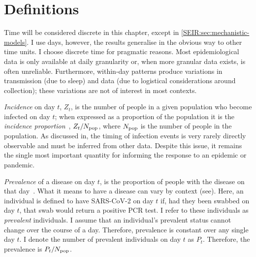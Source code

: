 \documentclass[thesis.tex]{subfiles}
\begin{document}
\section{Definitions} \label{inc-prev:sec:definitions}

Time will be considered discrete in this chapter, except in \cref{SEIR:sec:mechanistic-models}.
I use days, however, the results generalise in the obvious way to other time units.
I choose discrete time for pragmatic reasons.
Most epidemiological data is only available at daily granularity or, when more granular data exists, is often unreliable.
Furthermore, within-day patterns produce variations in transmission (\eg due to sleep) and data (\eg due to logistical considerations around collection); these variations are not of interest in most contexts.

\emph{Incidence} on day $t$, $Z_t$, is the number of people in a given population who become infected on day $t$; when expressed as a proportion of the population it is the \emph{incidence proportion}~\autocite[89]{lashModern}, $Z_t/N_\text{pop}$, where $N_\text{pop}$ is the number of people in the population.
As discussed in, the timing of infection events is very rarely directly observable and must be inferred from other data.
Despite this issue, it remains the single most important quantity for informing the response to an epidemic or pandemic.

\emph{Prevalence} of a disease on day $t$, is the proportion of people with the disease on that day~\autocite[90]{lashModern}.
What it means to have a disease can vary by context (see).
Here, an individual is defined to have SARS-CoV-2 on day $t$ if, had they been swabbed on day $t$, that swab would return a positive PCR test.
I refer to these individuals as \emph{prevalent} individuals.
I assume that an individual's prevalent status cannot change over the course of a day.
Therefore, prevalence is constant over any single day $t$.
I denote the number of prevalent individuals on day $t$ as $P_t$.
Therefore, the prevalence is $P_t/N_\text{pop}$.
\end{document}
